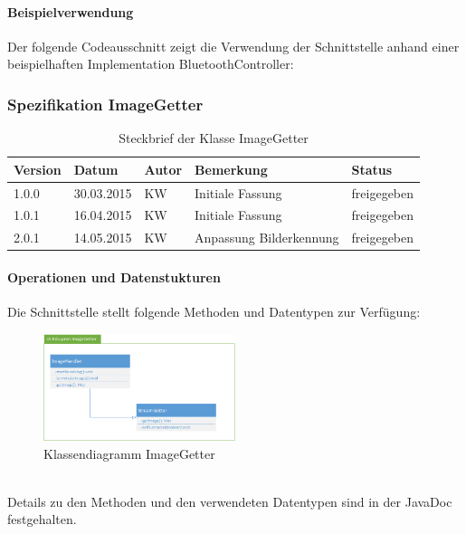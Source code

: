 \paragraph{Beispielverwendung}
Der folgende Codeausschnitt zeigt die Verwendung der Schnittstelle anhand einer beispielhaften Implementation BluetoothController: \\


\subsubsection{Spezifikation ImageGetter}


\begin{table}[h!]
	\begin{tabular}{|l|l|l|l|l|}
		\hline 
		Version & Datum & Autor & Bemerkung & Status \\ 
		\hline 
		1.0.0 & 30.03.2015 & KW & Initiale Fassung & freigegeben \\ 
		\hline 
		1.0.1 & 16.04.2015 & KW & Initiale Fassung & freigegeben \\ 
		\hline 
		2.0.1 & 14.05.2015 & KW & Anpassung Bilderkennung & freigegeben \\ 
		\hline 
	\end{tabular} 
	\caption{Steckbrief der Klasse ImageGetter}
\end{table}

\paragraph{Operationen und Datenstukturen}

Die Schnittstelle stellt folgende Methoden und Datentypen zur Verfügung:  \\
\begin{figure}[h!]          
	\centering             
	\includegraphics[width=0.5\textwidth]{../fig/Klassendiagramm_ImageGetter.png}
	\caption{Klassendiagramm ImageGetter}
	\label{fig:Klassendiagramm ImageGetter}        
\end{figure} \\
Details zu den Methoden und den verwendeten Datentypen sind in der JavaDoc festgehalten. \\


